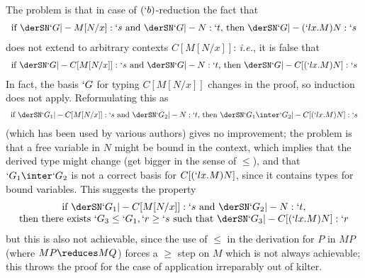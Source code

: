 \documentclass{CSML}
\begin{document}
The problem is that in case of $(`b)$-reduction the fact that
 \[ \begin{array}{c}
\textrm{if }\derSN `G |- M[N/x] : `s \textrm{ and } \derSN `G |- N : `t \textrm{, then }\derSN `G |- (`l x.M)N : `s 
 \end{array} \]
does not extend to arbitrary contexts $C[M[N/x]]$: \emph{i.e.}, it is false that
 \[ \begin{array}{c}
\textrm{if }\derSN `G |- C[M[N/x]] : `s \textrm{ and } \derSN `G |- N : `t \textrm{, then }\derSN `G |- C[(`l x.M)N] : `s 
 \end{array} \]
In fact, the basis $`G$ for typing $C[M[N/x]] $ changes in the proof, so induction does not apply.
Reformulating this as 
%
 \[ \begin{array}{c}
\textrm{if }\derSN `G_1 |- C[M[N/x]] : `s \textrm{ and }\derSN `G_2 |- N : `t \textrm{, then }\derSN `G_1\inter `G_2 |- C[(`l x.M)N] : `s 
 \end{array} \]
(which has been used by various authors)
gives no improvement; the problem is that a free variable in $N$ might be bound in the context, which implies that the derived type might change (get bigger in the sense of $\leq$), and that $`G_1\inter `G_2$ is not a correct basis for $C[(`l x.M)N]$, since it contains types for bound variables.
This suggests the property 
%
 \[ \begin{array}{c}
\textrm{if }\derSN `G_1 |- C[M[N/x]] : `s \textrm{ and } \derSN `G_2 |- N : `t , \\ \textrm{then there exists }`G_3 \leq `G_1, `r \geq `s \textrm{ such that }\derSN `G_3 |- C[(`l x.M)N] : `r 
 \end{array} \]
but this is also not achievable, since the use of $\leq$ in the derivation for $P$ in $MP$ (where $MP \reduces MQ$) forces a $\geq$ step on $M$ which is not always achievable; this throws the proof for the case of application irreparably out of kilter.
\end{document}
